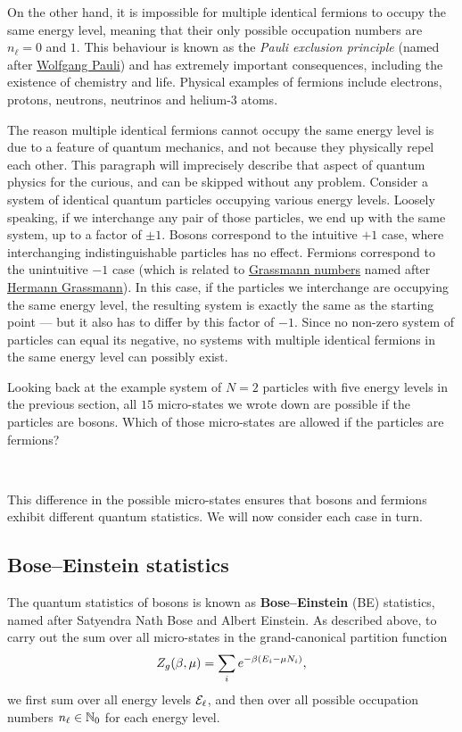 On the other hand, it is impossible for multiple identical fermions to occupy the same energy level, meaning that their only possible occupation numbers are $n_{\ell} = 0$ and $1$.
This behaviour is known as the \textit{Pauli exclusion principle} (named after \href{https://en.wikipedia.org/wiki/Wolfgang_Pauli}{Wolfgang Pauli}) and has extremely important consequences, including the existence of chemistry and life.
Physical examples of fermions include electrons, protons, neutrons, neutrinos and helium-$3$ atoms.

The reason multiple identical fermions cannot occupy the same energy level is due to a feature of quantum mechanics, and not because they physically repel each other.
This paragraph will imprecisely describe that aspect of quantum physics for the curious, and can be skipped without any problem.
Consider a system of identical quantum particles occupying various energy levels.
Loosely speaking, if we interchange any pair of those particles, we end up with the same system, up to a factor of $\pm 1$.
Bosons correspond to the intuitive $+1$ case, where interchanging indistinguishable particles has no effect.
Fermions correspond to the unintuitive $-1$ case (which is related to \href{https://en.wikipedia.org/wiki/Grassmann_number}{Grassmann numbers} named after \href{https://en.wikipedia.org/wiki/Hermann_Grassmann}{Hermann Grassmann}).
In this case, if the particles we interchange are occupying the same energy level, the resulting system is exactly the same as the starting point --- but it also has to differ by this factor of $-1$.
Since no non-zero system of particles can equal its negative, no systems with multiple identical fermions in the same energy level can possibly exist.

Looking back at the example system of $N = 2$ particles with five energy levels in the previous section, all $15$ micro-states we wrote down are possible if the particles are bosons.
Which of those micro-states are allowed if the particles are fermions?
\begin{mdframed}
  \ \\[24 pt]
\end{mdframed}
This difference in the possible micro-states ensures that bosons and fermions exhibit different quantum statistics.
We will now consider each case in turn.



\subsection{Bose--Einstein statistics}
The quantum statistics of bosons is known as \textbf{Bose--Einstein} (BE) statistics, named after Satyendra Nath Bose and Albert Einstein.
As described above, to carry out the sum over all micro-states in the grand-canonical partition function
\begin{equation*}
  Z_g(\beta, \mu) = \sum_i e^{-\beta (E_i - \mu N_i)},
\end{equation*}
we first sum over all energy levels $\mathcal E_{\ell}$, and then over all possible occupation numbers $n_{\ell} \in \mathbb N_0$ for each energy level.

